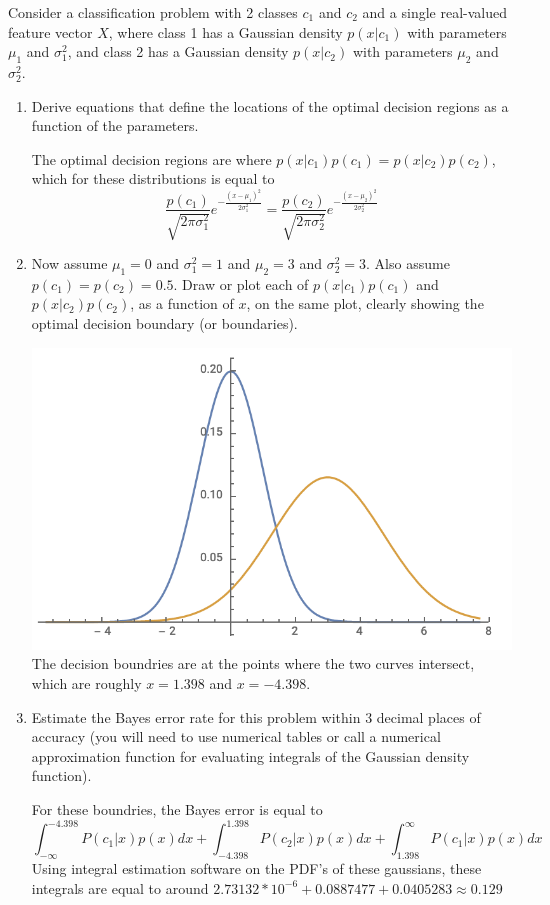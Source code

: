 \documentclass[11pt]{article}
\begin{document}
Consider a classification problem with 2 classes $c_1$ and $c_2$ and a single real-valued feature vector $X$, where class 1 has a Gaussian density $p(x|c_1)$ with parameters $\mu_1$ and $\sigma_1^2$, and class 2 has a Gaussian density $p(x|c_2)$ with parameters $\mu_2$ and $\sigma_2^2$.  
\begin{enumerate}
\item Derive equations that define the locations of the optimal decision regions as a function of the parameters.

The optimal decision regions are where $p(x|c_1)p(c_1) = p(x|c_2)p(c_2)$, which for these distributions is equal to 
\begin{equation}
	\frac{p(c_1)}{\sqrt{2\pi\sigma_1^2}}e^{-\frac{(x-\mu_1)^2}{2\sigma_1^2}} = 
	\frac{p(c_2)}{\sqrt{2\pi\sigma_2^2}}e^{-\frac{(x-\mu_2)^2}{2\sigma_2^2}}
\end{equation}

\item Now assume $\mu_1 = 0$ and $\sigma_1^2 = 1$ and $\mu_2=3$ and $\sigma_2^2 = 3$. Also assume $p(c_1) = p(c_2) = 0.5$.  Draw or plot each of $p(x|c_1)p(c_1)$ and $p(x|c_2)p(c_2)$, as a function of $x$, on the same plot, clearly showing the optimal decision boundary (or boundaries).

\includegraphics[scale=0.5]{graph3.png} \\
The decision boundries are at the points where the two curves intersect, which are roughly $x=1.398$ and $x=-4.398$.

\item Estimate the Bayes error rate for this problem within 3 decimal places of accuracy (you will need to use numerical tables or call a numerical approximation function for evaluating integrals of the Gaussian density function).

For these boundries, the Bayes error is equal to
\begin{equation}
	\int_{-\infty}^{-4.398} P(c_1|x)p(x) dx + \int_{-4.398}^{1.398} P(c_2|x)p(x) dx + \int_{1.398}^\infty P(c_1|x)p(x)dx
\end{equation}
Using integral estimation software on the PDF's of these gaussians, these integrals are equal to around $2.73132*10^{-6}+0.0887477+0.0405283 \approx 0.129$

\end{enumerate} 
\end{document}
